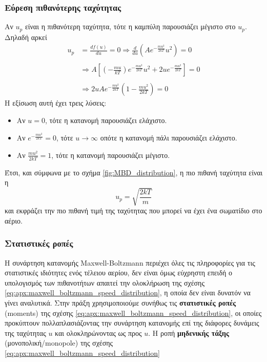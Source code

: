 \subsubsection{Εύρεση πιθανότερης ταχύτητας}
Αν $u_p$ είναι η πιθανότερη ταχύτητα, τότε η καμπύλη παρουσιάζει μέγιστο στο $u_p$. Δηλαδή αρκεί
\begin{align*}
    u_p &= \frac{df(u)}{du} = 0 \Rightarrow \frac{d}{du} \left( A e^{-\frac{mu^2}{2kT}} u^2 \right) = 0 \\\\
    &\Rightarrow A \left[ \left( - \frac{mu}{kT} \right) e^{-\frac{mu^2}{2kT}} u^2 + 2u e^{-\frac{mu^2}{2kT}}  \right] = 0 \\\\
    &\Rightarrow 2u A e^{-\frac{mu^2}{2kT}} \left(1 - \frac{mu^2}{2kT} \right) = 0
\end{align*}
Η εξίσωση αυτή έχει τρεις λύσεις:
\begin{itemize}
    \item Αν $u=0$, τότε η κατανομή παρουσιάζει ελάχιστο.
    \item Αν $e^{-\frac{mu^2}{2kT}} = 0$, τότε $u \rightarrow \infty$ οπότε η κατανομή πάλι παρουσιάζει ελάχιστο.
    \item Αν $\frac{mu^2}{2kT} = 1$, τότε η κατανομή παρουσιάζει μέγιστο.
\end{itemize}
Έτσι, και σύμφωνα με το σχήμα \ref{fig:MBD_distribution}, η πιο πιθανή ταχύτητα είναι η 
\begin{equation}
    \label{eq:apx:most_probable_speed}
    \boxed{u_p = \sqrt{\frac{2kT}{m}}}
\end{equation}
και εκφράζει την πιο πιθανή τιμή της ταχύτητας που μπορεί να έχει ένα σωματίδιο στο αέριο.



\subsubsection{Στατιστικές ροπές}
Η συνάρτηση κατανομής Maxwell-Boltzmann περιέχει όλες τις πληροφορίες για τις στατιστικές ιδιότητες ενός τέλειου αερίου, δεν είναι όμως εύχρηστη επειδή ο υπολογισμός των πιθανοτήτων απαιτεί την ολοκλήρωση της σχέσης \eqref{eq:apx:maxwell_boltzmann_speed_distribution}, η οποία δεν είναι δυνατόν να γίνει αναλυτικά. Στην πράξη χρησιμοποιούμε συνήθως τις \textbf{στατιστικές ροπές} (moments) της σχέσης \eqref{eq:apx:maxwell_boltzmann_speed_distribution}, οι οποίες προκύπτουν πολλαπλασιάζοντας την συνάρτηση κατανομής επί της διάφορες δυνάμεις της ταχύτητας $u$ και ολοκληρώνοντας ως προς $u$. 
Η ροπή \textbf{μηδενικής τάξης} (μονοπολική/monopole) της σχέσης \eqref{eq:apx:maxwell_boltzmann_speed_distribution}

